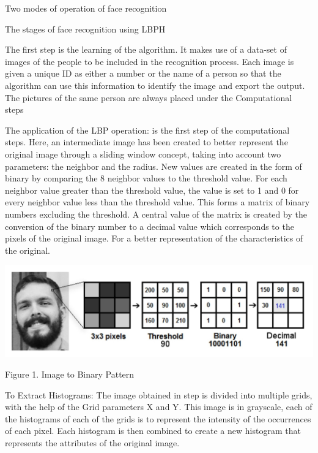 \documentclass[final]{beamer}
\newlength{\colwidth}
\begin{document}
\begin{frame}[t]
\begin{columns}[t]
\begin{column}{\colwidth}
\begin{block}{Two modes of operation of face recognition}
  \end{block}

\graphicspath{ {./logos} }
  \begin{block}{The stages of face recognition using LBPH}
  

The first step is the learning of the algorithm. It makes use of a data-set of images of the people to be included in the recognition process. Each image is given a unique ID as either a number or the name of a person so that the algorithm can use this information to identify the image and export the output. The pictures of the same person are always placed under the Computational steps

The application of the LBP operation: is the first step of the computational steps. Here, an intermediate image has been created to better represent the original image through a sliding window concept, taking into account two parameters: the neighbor and the radius. New values are created in the form of binary by comparing the 8 neighbor values to the threshold value. For each neighbor value greater than the threshold value, the value is set to 1 and 0 for every neighbor value less than the threshold value. This forms a matrix of binary numbers excluding the threshold. A central value of the matrix is created by the conversion of the binary number to a decimal value which corresponds to the pixels of the original image. For a better representation of the characteristics of the original.

\includegraphics{figure11}

\begin{center}
    \caption{Figure 1. Image to Binary Pattern}  \hfill
\end{center}

To Extract Histograms: The image obtained in step is divided into multiple grids, with the help of the Grid parameters X and Y. This image is in grayscale, each of the histograms of each of the grids is to represent the intensity of the occurrences of each pixel. Each histogram is then combined to create a new histogram that represents the attributes of the original image.
 


\end{block}
\end{column}
\end{columns}
\end{frame}
\end{document}
